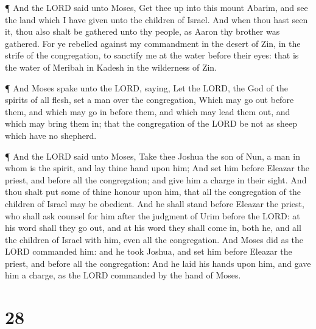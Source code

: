  ¶ And the LORD said unto Moses, Get thee up into this
mount Abarim, and see the land which I have given unto the children of
Israel.  And when thou hast seen it, thou also shalt be
gathered unto thy people, as Aaron thy brother was gathered.
 For ye rebelled against my commandment in the desert of
Zin, in the strife of the congregation, to sanctify me at the water
before their eyes: that is the water of Meribah in Kadesh in the
wilderness of Zin.

 ¶ And Moses spake unto the LORD, saying,  Let
the LORD, the God of the spirits of all flesh, set a man over the
congregation,  Which may go out before them, and which may
go in before them, and which may lead them out, and which may bring them
in; that the congregation of the LORD be not as sheep which have no
shepherd.

 ¶ And the LORD said unto Moses, Take thee Joshua the son
of Nun, a man in whom is the spirit, and lay thine hand upon him;
 And set him before Eleazar the priest, and before all the
congregation; and give him a charge in their sight.  And
thou shalt put some of thine honour upon him, that all the congregation
of the children of Israel may be obedient.  And he shall
stand before Eleazar the priest, who shall ask counsel for him after the
judgment of Urim before the LORD: at his word shall they go out, and at
his word they shall come in, both he, and all the children of Israel
with him, even all the congregation.  And Moses did as the
LORD commanded him: and he took Joshua, and set him before Eleazar the
priest, and before all the congregation:  And he laid his
hands upon him, and gave him a charge, as the LORD commanded by the hand
of Moses.

\hypertarget{section-27}{%
\section{28}\label{section-27}}


